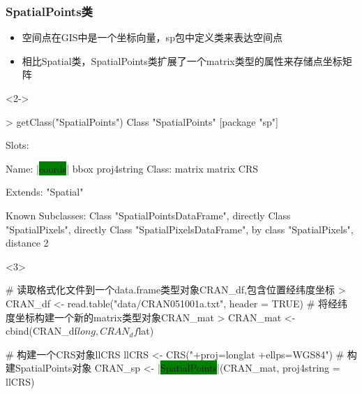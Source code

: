 \subsubsection{SpatialPoints类}
\begin{frame}[t,fragile]{\subsecname}{\subsubsecname}
\begin{itemize}
\item<1-> 空间点在GIS中是一个坐标向量，sp包中定义类来表达空间点
\item<2-> 相比Spatial类，SpatialPoints类扩展了一个matrix类型的属性来存储点坐标矩阵
\end{itemize}

\begin{overlayarea}{\textwidth}{\textheight}
\begin{onlyenv}<2->
\begin{rcode}
> getClass("SpatialPoints")
Class "SpatialPoints" [package "sp"]

Slots:
                                          
Name:       |\colorbox{green}{coords}|        bbox proj4string
Class:      matrix      matrix         CRS

Extends: "Spatial"

Known Subclasses: 
Class "SpatialPointsDataFrame", directly
Class "SpatialPixels", directly
Class "SpatialPixelsDataFrame", by class "SpatialPixels", distance 2
\end{rcode}
\end{onlyenv}

\begin{onlyenv}<3>
\begin{rcode}
# 读取格式化文件到一个data.frame类型对象CRAN\_df,包含位置经纬度坐标
> CRAN_df <- read.table("data/CRAN051001a.txt", header = TRUE)
# 将经纬度坐标构建一个新的matrix类型对象CRAN\_mat
> CRAN_mat <- cbind(CRAN_df$long, CRAN_df$lat)

# 构建一个CRS对象llCRS 
llCRS <- CRS("+proj=longlat +ellps=WGS84")
# 构建SpatialPoints对象
CRAN_sp <- |\colorbox{green}{SpatialPoints}|(CRAN_mat, proj4string = llCRS)
\end{rcode}
\end{onlyenv}
\end{overlayarea}
\end{frame}

